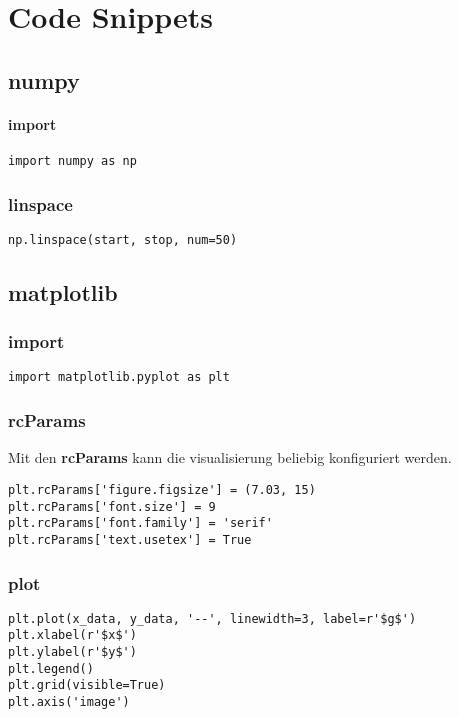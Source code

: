 \section{Code Snippets}

\subsection{numpy}

\paragraph{import}

\begin{verbatim}
import numpy as np
\end{verbatim}

\subsubsection{linspace}

\begin{verbatim}
np.linspace(start, stop, num=50)
\end{verbatim}

\subsection{matplotlib}

\subsubsection{import}

\begin{verbatim}
import matplotlib.pyplot as plt
\end{verbatim}

\subsubsection{rcParams}

Mit den \textbf{rcParams} kann die visualisierung beliebig konfiguriert werden.

\begin{verbatim}
plt.rcParams['figure.figsize'] = (7.03, 15)
plt.rcParams['font.size'] = 9
plt.rcParams['font.family'] = 'serif'
plt.rcParams['text.usetex'] = True
\end{verbatim}

\subsubsection{plot}

\begin{verbatim}
plt.plot(x_data, y_data, '--', linewidth=3, label=r'$g$')
plt.xlabel(r'$x$')
plt.ylabel(r'$y$')
plt.legend()
plt.grid(visible=True)
plt.axis('image')
\end{verbatim}